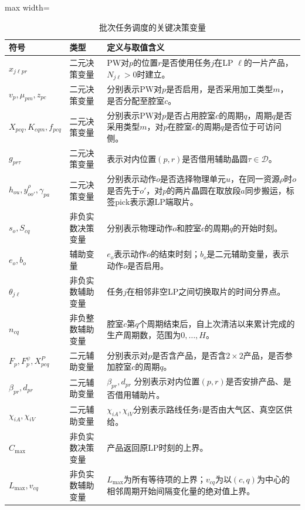 \begin{table}[!htbp]
\centering\small
\caption{批次任务调度的关键决策变量}
\label{tab:symbol-cn-b}
\renewcommand{\arraystretch}{1.05}
\setlength{\tabcolsep}{4pt}
\begin{adjustbox}{max width=\linewidth}
\begin{tabular}{@{}>{\raggedright\arraybackslash}p{}p{}p{}@{}}
\toprule
符号 & 类型 & 定义与取值含义\\\midrule
$x_{j\ell pr}$ & 二元决策变量 & PW对$p$的位置$r$是否使用任务$j$在LP $\ell$的一片产品，$N_{j\ell}>0$时建立。\\
$v_p,\mu_{pm},z_{pc}$ & 二元决策变量 & 分别表示PW对$p$是否启用，是否采用加工类型$m$，是否分配至腔室$c$。\\
$X_{pcq},K_{cqm},f_{pcq}$ & 二元决策变量 & 分别表示PW对$p$是否占用腔室$c$的周期$q$，周期$q$是否采用类型$m$，对$p$在腔室$c$的周期$q$是否位于可访问侧。\\
$g_{pr\tau}$ & 二元决策变量 & 表示对内位置$(p,r)$是否借用辅助晶圆$\tau\in\mathcal D$。\\
$h_{ou},y^\rho_{oo'},\gamma_{pa}$ & 二元决策变量 & 分别表示动作$o$是否选择物理单元$u$，在同一资源$\rho$时$o$是否先于$o'$，对$p$的两片晶圆在取放段$a$同步搬运，标签$\mathrm{pick}$表示源LP端取片。\\
$s_o,S_{cq}$ & 非负实数决策变量 & 分别表示物理动作$o$和腔室$c$的周期$q$的开始时刻。\\
$e_o,b_o$ & 辅助变量 & $e_o$表示动作$o$的结束时刻；$b_o$是二元辅助变量，表示动作$o$是否启用。\\
$\theta_{j\ell}$ & 非负实数辅助变量 & 任务$j$在相邻非空LP之间切换取片的时间分界点。\\
$n_{cq}$ & 非负整数辅助变量 & 腔室$c$第$q$个周期结束后，自上次清洁以来累计完成的生产周期数，范围为$0,\ldots,H$。\\
$F_p,F_p^\psi,X^P_{pcq}$ & 二元辅助变量 & 分别表示对$p$是否含产品，是否含$2\times2$产品，是否参加腔室$c$的周期$q$。\\
$\beta_{pr},d_{pr}$ & 二元辅助变量 & $\beta_{pr},d_{pr}$ 分别表示对内位置$(p,r)$是否安排产品、是否借用辅助片。\\
$\chi_{iA},\chi_{iV}$ & 二元辅助变量 & $\chi_{iA},\chi_{iV}$分别表示路线任务$i$是否由大气区、真空区供给。\\
$C_{\max}$ & 非负实数决策变量 & 产品返回原LP时刻的上界。\\
$L_{\max},v_{cq}$ & 非负实数辅助变量 & $L_{\max}$为所有等待项的上界；$v_{cq}$为以$(c,q)$为中心的相邻周期开始间隔变化量的绝对值上界。\\
\bottomrule
\end{tabular}
\end{adjustbox}
\end{table}

